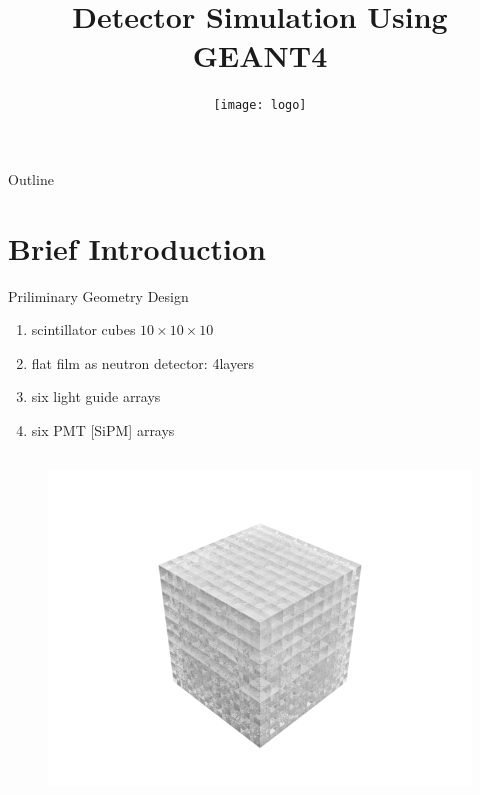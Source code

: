 \documentclass[11pt,compress,xcolor=x11names,UTF8]{beamer}
\title{Detector Simulation Using GEANT4}
\author[Rong Zhao]{Email：zhaor25@mail2.sysu.edu.cn \and  } %
\institute[SYSU]{School of Physics\and } %
\date[\today]{\texttt{[image: logo]}}
\begin{document}
\maketitle

\begin{frame}{Outline}
\tableofcontents
\end{frame}

\section{Brief Introduction}


\begin{frame}{Priliminary Geometry Design}
\begin{enumerate}
\item scintillator cubes $10\times 10 \times 10$
\item flat film as neutron detector: 4layers
\item six light guide arrays
\item six PMT [SiPM] arrays
\end{enumerate}
\vspace{-1cm}
\begin{columns}
\begin{column}{.33\textwidth}
\begin{figure}
\centering
\includegraphics[width=1.3\textwidth]{currentfig/geo1.png} %

\end{figure}
\end{column}
\end{columns}
\end{frame}
\end{document}
